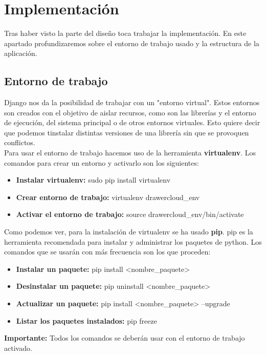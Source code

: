 \chapter{Implementación}

Tras haber visto la parte del diseño toca trabajar la implementación. En este apartado profundizaremos sobre el entorno de trabajo usado y la estructura de la aplicación.

\section{Entorno de trabajo}
Django nos da la posibilidad de trabajar con un "entorno virtual". Estos entornos son creados con el objetivo de aislar recursos, como son las librerías y el entorno de ejecución, del sistema principal o de otros entornos virtuales. Esto quiere decir que podemos tinstalar distintas versiones de una librería sin que se provoquen conflictos. \\
Para usar el entorno de trabajo hacemos uso de la herramienta \textbf{virtualenv}. Los comandos para crear un entorno y activarlo son los siguientes:

\begin{itemize}
	\item \textbf{Instalar virtualenv:} sudo pip install virtualenv
	\item \textbf{Crear entorno de trabajo:} virtualenv drawercloud\_env
	\item \textbf{Activar el entorno de trabajo:} source drawercloud\_env/bin/activate
\end{itemize}

Como podemos ver, para la instalación de virtualenv se ha usado \textbf{pip}. pip es la herramienta recomendada para instalar y administrar los paquetes de python. Los comandos que se usarán con más frecuencia son los que proceden:

\begin{itemize}
	\item \textbf{Instalar un paquete:} pip install <nombre\_paquete>
	\item \textbf{Desinstalar un paquete:} pip uninstall <nombre\_paquete>
	\item \textbf{Actualizar un paquete:} pip install <nombre\_paquete> --upgrade
	\item \textbf{Listar los paquetes instalados:} pip freeze
\end{itemize}

\textbf{Importante:} Todos los comandos se deberán usar con el entorno de trabajo activado.

